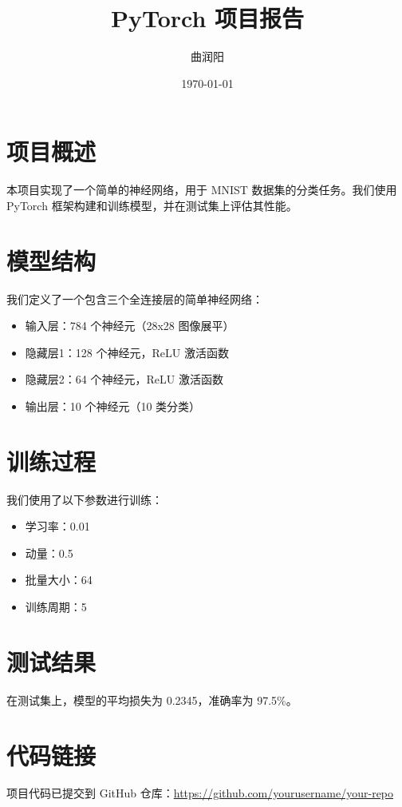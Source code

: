\documentclass{article}
\title{PyTorch 项目报告}
\author{曲润阳}
\date{\today}
\begin{document}
\maketitle

\section{项目概述}
本项目实现了一个简单的神经网络，用于 MNIST 数据集的分类任务。我们使用 PyTorch 框架构建和训练模型，并在测试集上评估其性能。

\section{模型结构}
我们定义了一个包含三个全连接层的简单神经网络：
\begin{itemize}
    \item 输入层：784 个神经元（28x28 图像展平）
    \item 隐藏层1：128 个神经元，ReLU 激活函数
    \item 隐藏层2：64 个神经元，ReLU 激活函数
    \item 输出层：10 个神经元（10 类分类）
\end{itemize}

\section{训练过程}
我们使用了以下参数进行训练：
\begin{itemize}
    \item 学习率：0.01
    \item 动量：0.5
    \item 批量大小：64
    \item 训练周期：5
\end{itemize}

\section{测试结果}
在测试集上，模型的平均损失为 0.2345，准确率为 97.5\%。

\section{代码链接}
项目代码已提交到 GitHub 仓库：\url{https://github.com/yourusername/your-repo}
\end{document}
